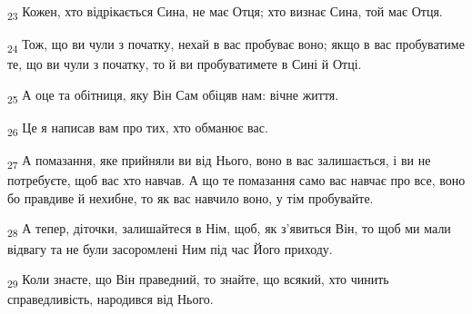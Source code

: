 \begin{tcolorbox}
\textsubscript{23} Кожен, хто відрікається Сина, не має Отця; хто визнає Сина, той має Отця.
\end{tcolorbox}
\begin{tcolorbox}
\textsubscript{24} Тож, що ви чули з початку, нехай в вас пробуває воно; якщо в вас пробуватиме те, що ви чули з початку, то й ви пробуватимете в Сині й Отці.
\end{tcolorbox}
\begin{tcolorbox}
\textsubscript{25} А оце та обітниця, яку Він Сам обіцяв нам: вічне життя.
\end{tcolorbox}
\begin{tcolorbox}
\textsubscript{26} Це я написав вам про тих, хто обманює вас.
\end{tcolorbox}
\begin{tcolorbox}
\textsubscript{27} А помазання, яке прийняли ви від Нього, воно в вас залишається, і ви не потребуєте, щоб вас хто навчав. А що те помазання само вас навчає про все, воно бо правдиве й нехибне, то як вас навчило воно, у тім пробувайте.
\end{tcolorbox}
\begin{tcolorbox}
\textsubscript{28} А тепер, діточки, залишайтеся в Нім, щоб, як з'явиться Він, то щоб ми мали відвагу та не були засоромлені Ним під час Його приходу.
\end{tcolorbox}
\begin{tcolorbox}
\textsubscript{29} Коли знаєте, що Він праведний, то знайте, що всякий, хто чинить справедливість, народився від Нього.
\end{tcolorbox}

